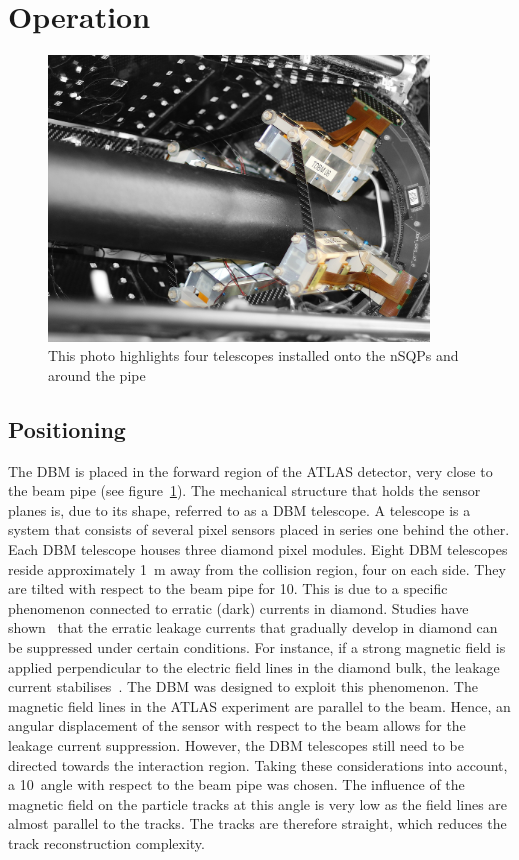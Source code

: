 \section{Operation}
\label{sec:operation}
\begin{figure}[!t]
\centering
\includegraphics[width=0.9\textwidth]{04_charge_monitoring/pics/DBM-installed-colour1}
\caption{This photo highlights four telescopes installed onto the nSQPs and around the pipe}
\label{fig:dbminatlas}
\end{figure}

\subsection{Positioning}
The DBM is placed in the forward region of the ATLAS detector, very close to the beam pipe (see figure~\ref{fig:dbminatlas}). The mechanical structure that holds the sensor planes is, due to its shape, referred to as a DBM telescope. A telescope is a system that consists of several pixel sensors placed in series one behind the other. Each DBM telescope houses three diamond pixel modules. Eight DBM telescopes reside approximately 1~m away from the collision region, four on each side. They are tilted with respect to the beam pipe for 10\textdegree. This is due to a specific phenomenon connected to erratic (dark) currents in diamond. Studies have shown~\cite{} that the erratic leakage currents that gradually develop in diamond can be suppressed under certain conditions. For instance, if a strong magnetic field is applied perpendicular to the electric field lines in the diamond bulk, the leakage current stabilises~\cite{}. The DBM was designed to exploit this phenomenon. The magnetic field lines in the ATLAS experiment are parallel to the beam. Hence, an angular displacement of the sensor with respect to the beam allows for the leakage current suppression. However, the DBM telescopes still need to be directed towards the interaction region. Taking these considerations into account, a 10\textdegree~angle with respect to the beam pipe was chosen. The influence of the magnetic field on the particle tracks at this angle is very low as the field lines are almost parallel to the tracks. The tracks are therefore straight, which reduces the track reconstruction complexity.

